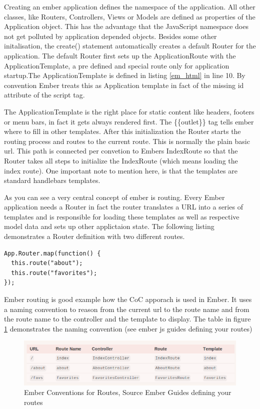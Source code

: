 Creating an ember application defines the namespace of the application. All other classes, like Routers, Controllers, Views or Models are defined as properties of the Application object. This has the advantage that the JavaScript namespace does not get polluted by application depended objects. Besides some other initalisation, the create() statement automatically creates a default Router for the application. The default Router first sets up the ApplicationRoute with the ApplicationTemplate, a pre defined and special route only for application startup.The ApplicationTemplate is defined in listing \ref{em_html} in line 10. By convention Ember treats this as Application template in fact of the missing id attribute of the script tag. 

The ApplicationTemplate is the right place for static content like headers, footers or menu bars, in fact it gets always rendered first. The \{\{outlet\}\} tag tells ember where to fill in other templates. After this initialization the Router starts the routing process and routes to the current route. This is normally the plain basic url. This path is connected per convetion to Embers IndexRoute so that the Router takes all steps to initialize the IndexRoute (which means loading the index route). One important note to mention here, is that the templates are standard handlebars templates.

As you can see a very central concept of ember is routing. Every Ember application needs a Router in fact the router translates a URL into a series of templates and is responsible for loading these templates as well as respective model data and sets up other applictaion state. The following listing demonstrates a Router definition with two different routes. 
\begin{lstlisting}[caption=app.js]
App.Router.map(function() {
  this.route("about");
  this.route("favorites");
});
\end{lstlisting}

Ember routing is good example how the CoC apporach is used in Ember. It uses a naming convention to reason from the current url to the route name and from the route name to the controller and the template to display. The table in figure \ref{fig:ember_routes} demonstrates the naming convention (see ember js guides defining your routes)  

\begin{figure}
	\centering	\includegraphics[width=1.0\textwidth]{./img/ember_routes_conventions.png}
	\caption{Ember Conventions for Routes, Source Ember Guides defining your routes}
	\label{fig:ember_routes}
\end{figure}


